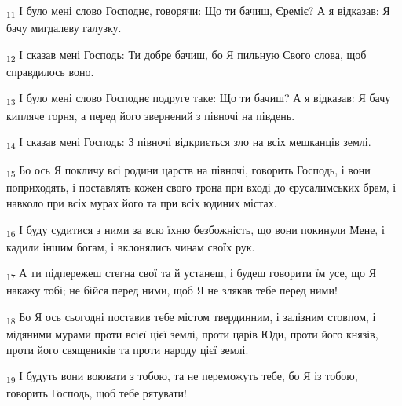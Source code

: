 \begin{tcolorbox}
\textsubscript{11} І було мені слово Господнє, говорячи: Що ти бачиш, Єреміє? А я відказав: Я бачу мигдалеву галузку.
\end{tcolorbox}
\begin{tcolorbox}
\textsubscript{12} І сказав мені Господь: Ти добре бачиш, бо Я пильную Свого слова, щоб справдилось воно.
\end{tcolorbox}
\begin{tcolorbox}
\textsubscript{13} І було мені слово Господнє подруге таке: Що ти бачиш? А я відказав: Я бачу кипляче горня, а перед його звернений з півночі на південь.
\end{tcolorbox}
\begin{tcolorbox}
\textsubscript{14} І сказав мені Господь: З півночі відкриється зло на всіх мешканців землі.
\end{tcolorbox}
\begin{tcolorbox}
\textsubscript{15} Бо ось Я покличу всі родини царств на півночі, говорить Господь, і вони поприходять, і поставлять кожен свого трона при вході до єрусалимських брам, і навколо при всіх мурах його та при всіх юдиних містах.
\end{tcolorbox}
\begin{tcolorbox}
\textsubscript{16} І буду судитися з ними за всю їхню безбожність, що вони покинули Мене, і кадили іншим богам, і вклонялись чинам своїх рук.
\end{tcolorbox}
\begin{tcolorbox}
\textsubscript{17} А ти підпережеш стегна свої та й устанеш, і будеш говорити їм усе, що Я накажу тобі; не бійся перед ними, щоб Я не злякав тебе перед ними!
\end{tcolorbox}
\begin{tcolorbox}
\textsubscript{18} Бо Я ось сьогодні поставив тебе містом твердинним, і залізним стовпом, і мідяними мурами проти всієї цієї землі, проти царів Юди, проти його князів, проти його священиків та проти народу цієї землі.
\end{tcolorbox}
\begin{tcolorbox}
\textsubscript{19} І будуть вони воювати з тобою, та не переможуть тебе, бо Я із тобою, говорить Господь, щоб тебе рятувати!
\end{tcolorbox}
